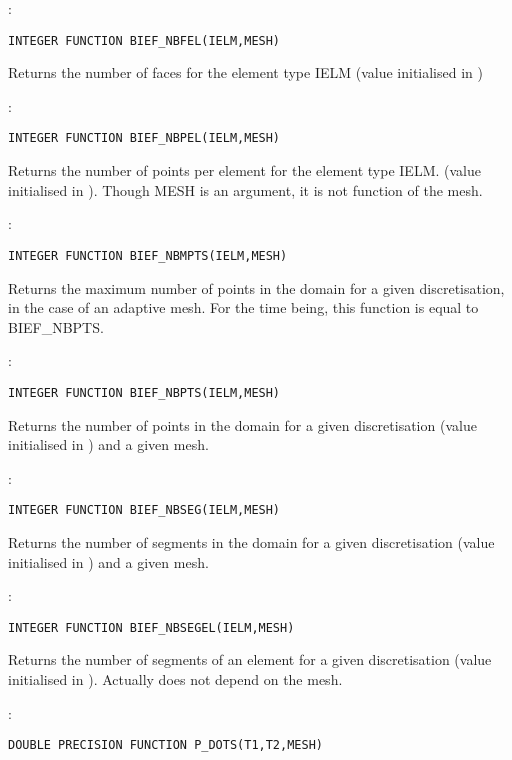 :
\begin{lstlisting}[language=TelFortran]
INTEGER FUNCTION BIEF_NBFEL(IELM,MESH)
\end{lstlisting}

Returns the number of faces for the element type IELM (value initialised in
)

:
\begin{lstlisting}[language=TelFortran]
INTEGER FUNCTION BIEF_NBPEL(IELM,MESH)
\end{lstlisting}

Returns the number of points per element for the element type IELM. (value
initialised in ). Though MESH is an argument, it is not function
of the mesh.

:
\begin{lstlisting}[language=TelFortran]
INTEGER FUNCTION BIEF_NBMPTS(IELM,MESH)
\end{lstlisting}

Returns the maximum number of points in the domain for a given discretisation,
in the case of an adaptive mesh. For the time being, this function is equal to
BIEF\_NBPTS.

:
\begin{lstlisting}[language=TelFortran]
INTEGER FUNCTION BIEF_NBPTS(IELM,MESH)
\end{lstlisting}

Returns the number of points in the domain for a given discretisation (value
initialised in ) and a given mesh.

:
\begin{lstlisting}[language=TelFortran]
INTEGER FUNCTION BIEF_NBSEG(IELM,MESH)
\end{lstlisting}

Returns the number of segments in the domain for a given discretisation (value
initialised in ) and a given mesh.

:
\begin{lstlisting}[language=TelFortran]
INTEGER FUNCTION BIEF_NBSEGEL(IELM,MESH)
\end{lstlisting}

Returns the number of segments of an element for a given discretisation (value
initialised in ). Actually does not depend on the mesh.

:
\begin{lstlisting}[language=TelFortran]
DOUBLE PRECISION FUNCTION P_DOTS(T1,T2,MESH)
\end{lstlisting}

